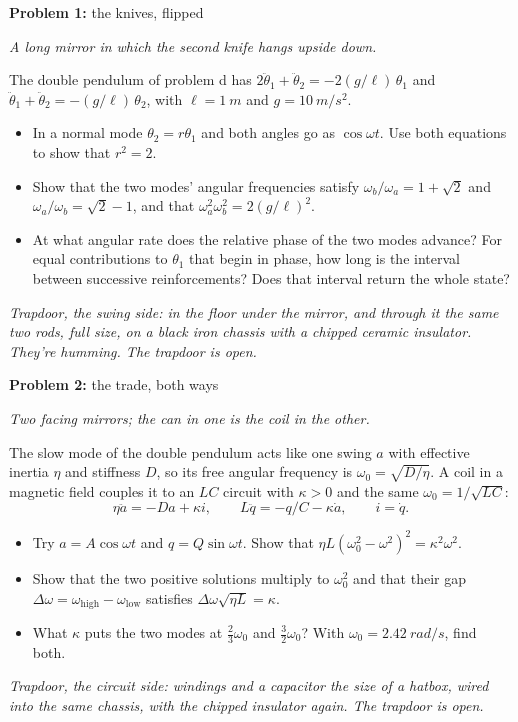 \documentclass[11pt]{article}
\newcommand{\scene}[1]{\par{\itshape #1}\par}
\newcommand{\problem}[2]{\par\medskip\textbf{Problem #1:} #2\par\nopagebreak}
\newenvironment{parts}{\begin{itemize}[leftmargin=3.4em,labelwidth=2.8em,labelsep=0.6em,align=left,itemsep=2pt,topsep=3pt]}{\end{itemize}}
\newcommand{\pt}[1]{\item[\textbf{#1}]}
\begin{document}
\problem{1}{the knives, flipped}
\scene{A long mirror in which the second knife hangs upside down.}
The double pendulum of problem d has $2\ddot\theta_1 + \ddot\theta_2 = -2(g/\ell)\,\theta_1$ and $\ddot\theta_1 + \ddot\theta_2 = -(g/\ell)\,\theta_2$, with $\ell = \SI{1}{m}$ and $g = \SI{10}{m/s^2}$.
\begin{parts}
\pt{1-$\alpha$} In a normal mode $\theta_2 = r\theta_1$ and both angles go as $\cos\omega t$. Use both equations to show that $r^2 = 2$.
\pt{1-$\beta$} Show that the two modes' angular frequencies satisfy $\omega_b/\omega_a = 1 + \sqrt2$ and $\omega_a/\omega_b = \sqrt2 - 1$, and that $\omega_a^2\omega_b^2 = 2(g/\ell)^2$.
\pt{1-$\gamma$} At what angular rate does the relative phase of the two modes advance? For equal contributions to $\theta_1$ that begin in phase, how long is the interval between successive reinforcements? Does that interval return the whole state?
\end{parts}
\scene{Trapdoor, the swing side: in the floor under the mirror, and through it the same two rods, full size, on a black iron chassis with a chipped ceramic insulator. They're humming. The trapdoor is open.}

\problem{2}{the trade, both ways}
\scene{Two facing mirrors; the can in one is the coil in the other.}
The slow mode of the double pendulum acts like one swing $a$ with effective inertia $\eta$ and stiffness $D$, so its free angular frequency is $\omega_0 = \sqrt{D/\eta}$. A coil in a magnetic field couples it to an $LC$ circuit with $\kappa > 0$ and the same $\omega_0 = 1/\sqrt{LC}$:
\[ \eta\ddot a = -Da + \kappa i, \qquad L\ddot q = -q/C - \kappa\dot a, \qquad i = \dot q. \]
\begin{parts}
\pt{2-$\alpha$} Try $a = A\cos\omega t$ and $q = Q\sin\omega t$. Show that $\eta L(\omega_0^2 - \omega^2)^2 = \kappa^2\omega^2$.
\pt{2-$\beta$} Show that the two positive solutions multiply to $\omega_0^2$ and that their gap $\Delta\omega = \omega_{\mathrm{high}} - \omega_{\mathrm{low}}$ satisfies $\Delta\omega\sqrt{\eta L} = \kappa$.
\pt{2-$\gamma$} What $\kappa$ puts the two modes at $\frac23\omega_0$ and $\frac32\omega_0$? With $\omega_0 = \SI{2.42}{rad/s}$, find both.
\end{parts}
\scene{Trapdoor, the circuit side: windings and a capacitor the size of a hatbox, wired into the same chassis, with the chipped insulator again. The trapdoor is open.}
\end{document}
